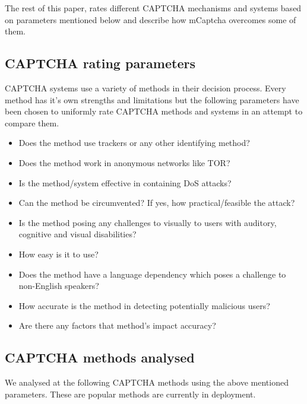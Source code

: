 \documentclass[conference]{IEEEtran}
\begin{document}
The rest of this paper, rates different CAPTCHA mechanisms and systems based on
parameters mentioned below and describe how mCaptcha overcomes some of
them. 

\subsection{CAPTCHA rating parameters}
CAPTCHA systems use a variety of methods in their decision process. Every method
has it's own strengths and limitations but the following parameters have been
chosen to uniformly rate CAPTCHA methods and systems in an attempt to compare
them.
\begin{description}
\item[Privacy] 
	\begin{itemize}
		\item Does the method use trackers or any other identifying method?
		\item Does the method work in anonymous networks like TOR?\
	\end{itemize}
\item[Effectiveness]
	\begin{itemize}
		\item Is the method/system effective in containing DoS attacks? 
		\item Can the method be circumvented? If yes, how practical/feasible
		the attack?

	\end{itemize}
\item[Accessibility]
	\begin{itemize}
		\item Is the method posing any challenges to visually to users
			with auditory, cognitive and visual disabilities? 
		\item How easy is it to use?
		\item Does the method have a language dependency which poses a challenge to
		non-English speakers?
	\end{itemize}
\item[Accuracy]
	\begin{itemize}
		\item How accurate is the method in detecting potentially malicious
			users?
		\item Are there any factors that method's impact accuracy?
	\end{itemize}
\end{description}

\subsection{CAPTCHA methods analysed}
We analysed at the following CAPTCHA methods using the above mentioned
parameters. These are popular methods are currently in deployment.
\end{document}
